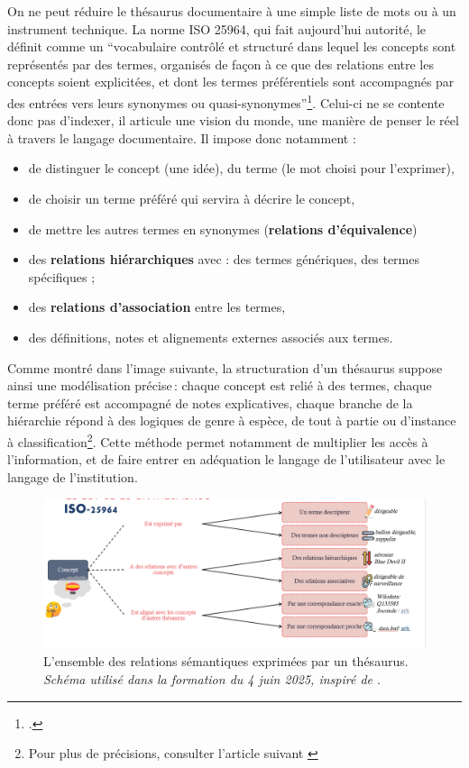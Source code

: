 On ne peut réduire le thésaurus documentaire à une simple liste de mots ou à un instrument technique. La norme ISO 25964, qui fait aujourd’hui autorité, le définit comme un \enquote{vocabulaire contrôlé et structuré dans lequel les concepts sont représentés par des termes, organisés de façon à ce que des relations entre les concepts soient explicitées, et dont les termes préférentiels sont accompagnés par des entrées vers leurs synonymes ou quasi-synonymes}\footcite{ISO25964120112011,maroyeISO25964Distinction2015}. Celui-ci ne se contente donc pas d’indexer, il articule une vision du monde, une manière de penser le réel à travers le langage documentaire. Il impose donc notamment :
\begin{itemize}
	\item de distinguer le concept (une idée), du terme (le mot choisi pour l'exprimer),
	\item de choisir un terme préféré qui servira à décrire le concept,
	\item de mettre les autres termes en synonymes (\textbf{relations d'équivalence})
	\item des \textbf{relations hiérarchiques} avec :
	\subitem des termes génériques,
	\subitem des termes spécifiques ;
	\item des \textbf{relations d'association} entre les termes,
	\item des définitions, notes et alignements externes associés aux termes.
\end{itemize}

Comme montré dans l'image suivante, la structuration d’un thésaurus suppose ainsi une modélisation précise : chaque concept est relié à des termes, chaque terme préféré est accompagné de notes explicatives, chaque branche de la hiérarchie répond à des logiques de genre à espèce, de tout à partie ou  d'instance à classification\footnote{Pour plus de précisions, consulter l'article suivant \cite{perrinBonnesPratiquesPour2020}}. Cette méthode permet notamment de multiplier les accès à l'information, et de faire entrer en adéquation le langage de l'utilisateur avec le langage de l'institution. 

\begin{figure}
	\centering
	\includegraphics[width=0.9\linewidth]{img/SCHEM_thesaurus}
	\caption[Relations sémantiques exprimées par un thésaurus]{L'ensemble des relations sémantiques exprimées par un thésaurus. \textit{Schéma utilisé dans la formation du 4 juin 2025, inspiré de \protect\cite{perrinBonnesPratiquesPour2020}}.}
	\label{fig:schemthesaurus}
\end{figure}

